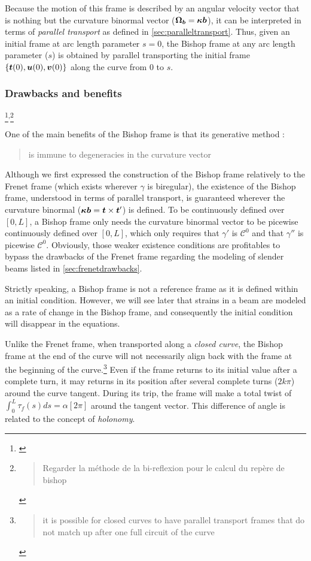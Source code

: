 Because the motion of this frame is described by an angular velocity vector that is nothing but the curvature binormal vector ($\boldsymbol{\Omega_b} = \boldsymbol{\kappa b}$), it can be interpreted in terms of \emph{parallel transport} as defined in \cref{sec:paralleltransport}. Thus, given an initial frame at arc length parameter $s=0$, the Bishop frame at any arc length parameter ($s$) is obtained by parallel transporting the initial frame $\{\boldsymbol{t}(0),\boldsymbol{u}(0), \boldsymbol{v}(0)\}$ along the curve from $0$ to $s$.

\subsubsection{Drawbacks and benefits}
\footnote{\cite{Guggenheimer1989, Klok1986, Bloomenthal1990, Wang2008, Poston1995, Menninger2013}}\textsuperscript{,}\footnote{\blockcquote[p.6]{Wang2008}{Regarder la méthode de la bi-reflexion pour le calcul du repère de bishop}}

One of the main benefits of the Bishop frame is that its generative method : \blockcquote{Bloomenthal1990}{is immune to degeneracies in the curvature vector}. Although we first expressed the construction of the Bishop frame relatively to the Frenet frame (which exists wherever $\gamma$ is biregular), the existence of the Bishop frame, understood in terms of parallel transport, is guaranteed wherever the curvature binormal ($\boldsymbol{\kappa b} = \boldsymbol{t} \times \boldsymbol{t}'$) is defined. To be continuously defined over $[0,L]$, a Bishop frame only needs the curvature binormal vector to be picewise continuously defined over  $[0,L]$, which only requires that $\gamma'$ is $\mathcal{C}^0$ and that $\gamma''$ is picewise $\mathcal{C}^0$. Obviously, those weaker existence conditions are profitables to bypass the drawbacks of the Frenet frame regarding the modeling of slender beams listed in \cref{sec:frenetdrawbacks}.

Strictly speaking, a Bishop frame is not a reference frame as it is defined within an initial condition. However, we will see later that strains in a beam are modeled as a rate of change in the Bishop frame, and consequently the initial condition will disappear in the equations.

Unlike the Frenet frame, when transported along a \emph{closed curve}, the Bishop frame at the end of the curve will not necessarily align back with the frame at the beginning of the curve.\footnote{\blockcquote{Hanson95}{it is possible for closed curves to have parallel transport frames that do not match up after one full circuit of the curve}} Even if the frame returns to its initial value after a complete turn, it may returns in its position after several complete turns ($2k\pi$) around the curve tangent. During its trip, the frame will make a total twist of $\int_0^L \tau_f(s)ds = \alpha[2\pi]$ around the tangent vector. This difference of angle is related to the concept of  \emph{holonomy}.

